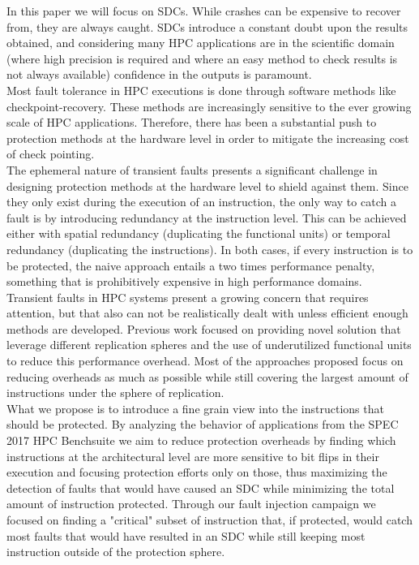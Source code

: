 \documentclass[lettersize,journal]{IEEEtran}
\begin{document}
In this paper we will focus on SDCs. While crashes can be expensive to recover from, they are always caught. SDCs introduce a constant doubt upon the results obtained, and considering many HPC applications are in the scientific domain (where high precision is required and where an easy method to check results is not always available) confidence in the outputs is paramount.\\
Most fault tolerance in HPC executions is done through software methods like checkpoint-recovery. \cite{snir2014addressing}These methods are increasingly sensitive to the ever growing scale of HPC applications. Therefore, there has been a substantial push to protection methods at the hardware level in order to mitigate the increasing cost of check pointing.  \\
The ephemeral nature of transient faults presents a significant challenge in designing protection methods at the hardware level to shield against them. Since they only exist during the execution of an instruction, the only way to catch a fault is by introducing redundancy at the instruction level. This can be achieved either with spatial redundancy (duplicating the functional units) or temporal redundancy (duplicating the instructions). In both cases, if every instruction is to be protected, the naive approach entails a two times performance penalty, something that is prohibitively expensive in high performance domains. \\
Transient faults in HPC systems present a growing concern that requires attention, but that also can not be realistically dealt with unless efficient enough methods are developed.
Previous work focused on providing novel solution that leverage different replication spheres and the use of underutilized functional units to reduce this performance overhead. Most of the approaches proposed focus on reducing overheads as much as possible while still covering the largest amount of instructions under the sphere of replication. \\
What we propose is to introduce a fine grain view into the instructions that should be protected. By analyzing the behavior of applications from the SPEC 2017 HPC Benchsuite we aim to reduce protection overheads by finding which instructions at the architectural level are more sensitive to bit flips in their execution and focusing protection efforts only on those, thus maximizing the detection of faults that would have caused an SDC while minimizing the total amount of instruction protected. Through our fault injection campaign we focused on finding a "critical" subset of instruction that, if protected, would catch most faults that would have resulted in an SDC while still keeping most instruction outside of the protection sphere.\\
\end{document}
